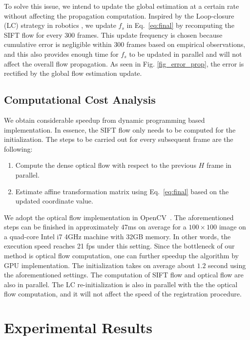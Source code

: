 \documentclass[10pt,journal]{IEEEtran}
\begin{document}
To solve this issue, we intend to update the global estimation at a certain rate without affecting the propagation computation. Inspired by the Loop-closure (LC) strategy in robotics \cite{close_loop_icra_05}, we update $f_s$ in Eq.~\eqref{eq:final} by recomputing the SIFT flow for every $300$ frames. This update frequency is chosen because cumulative error is negligible within $300$ frames based on empirical observations, and this also provides enough time for $f_s$ to be updated in parallel and will not affect the overall flow propagation. As seen in Fig. \ref{fig_error_prop}, the error is rectified by the global flow estimation update. 


\subsection{\label{sec:time}Computational Cost Analysis}
We obtain considerable speedup from dynamic programming based implementation. In essence, the SIFT flow only needs to be computed for the initialization. The steps to be carried out for every subsequent frame are the following:
\begin{enumerate}
\item Compute the dense optical flow with respect to the previous $H$ frame in parallel.
\item Estimate affine transformation matrix using Eq.~\eqref{eq:final} based on the updated coordinate value.
\end{enumerate}

We adopt the optical flow implementation in OpenCV~\cite{opencv}. The aforementioned steps can be finished in approximately $47$ms on average for a $100\times100$ image on a quad-core Intel i7 4GHz machine with 32GB memory. In other words, the execution speed reaches 21 fps under this setting. Since the bottleneck of our method is optical flow computation, one can further speedup the algorithm by GPU implementation. The initialization takes on average about $1.2$ second using the aforementioned settings. The computation of SIFT flow and optical flow are also in parallel. The LC re-initialization is also in parallel with the the optical flow computation, and it will not affect the speed of the registration procedure. 


\section{\label{sec:experiment}Experimental Results}
\end{document}
